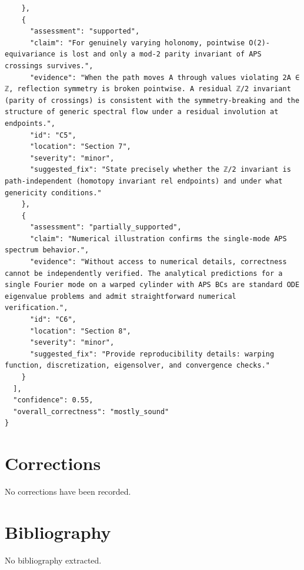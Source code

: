 \documentclass[11pt]{article}
\begin{document}
\begin{verbatim}
    },
    {
      "assessment": "supported",
      "claim": "For genuinely varying holonomy, pointwise O(2)-equivariance is lost and only a mod-2 parity invariant of APS crossings survives.",
      "evidence": "When the path moves A through values violating 2A ∈ ℤ, reflection symmetry is broken pointwise. A residual ℤ/2 invariant (parity of crossings) is consistent with the symmetry-breaking and the structure of generic spectral flow under a residual involution at endpoints.",
      "id": "C5",
      "location": "Section 7",
      "severity": "minor",
      "suggested_fix": "State precisely whether the ℤ/2 invariant is path-independent (homotopy invariant rel endpoints) and under what genericity conditions."
    },
    {
      "assessment": "partially_supported",
      "claim": "Numerical illustration confirms the single-mode APS spectrum behavior.",
      "evidence": "Without access to numerical details, correctness cannot be independently verified. The analytical predictions for a single Fourier mode on a warped cylinder with APS BCs are standard ODE eigenvalue problems and admit straightforward numerical verification.",
      "id": "C6",
      "location": "Section 8",
      "severity": "minor",
      "suggested_fix": "Provide reproducibility details: warping function, discretization, eigensolver, and convergence checks."
    }
  ],
  "confidence": 0.55,
  "overall_correctness": "mostly_sound"
}
\end{verbatim}

\section*{Corrections}
No corrections have been recorded.

\section*{Bibliography}
No bibliography extracted.

% 
% 
\end{document}

